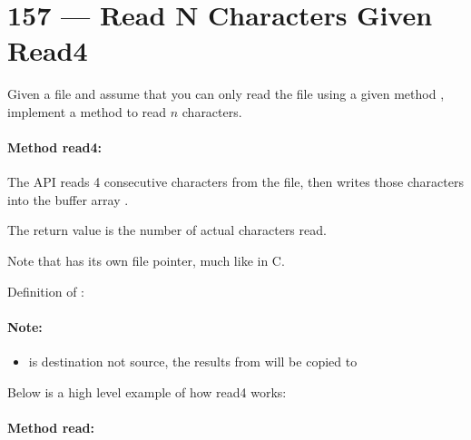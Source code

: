 \section{157 --- Read N Characters Given Read4}
Given a file and assume that you can only read the file using a given method , implement a method to read $n$ characters.
 

\paragraph{Method read4:}

\begin{flushleft}
The API  reads 4 consecutive characters from the file, then writes those characters into the buffer array .

The return value is the number of actual characters read.

Note that  has its own file pointer, much like  in C.

Definition of : 
\end{flushleft}

\paragraph{Note:} 

\begin{itemize}
\item {} is destination not source, the results from  will be copied to 
\end{itemize}

Below is a high level example of how read4 works:

\begin{flushleft}




\end{flushleft}
 
\paragraph{Method read:}

